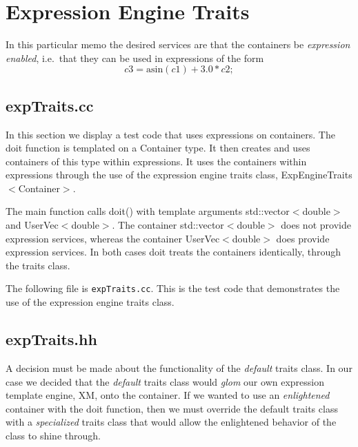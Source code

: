 \documentclass[11pt]{nmemo}
\newcommand{\cxxcode}{\color{codecolor}}
\newcommand{\code}[1]{\textcolor{codecolor}{#1}}
\newcommand{\tmpl}[1]{$<$#1$>$}
\begin{document}
\section{Expression Engine Traits}

In this particular memo the desired services are that the containers
be {\em expression enabled}, i.e.\ that they can be used in expressions of the
form
\begin{equation}
  \label{eq:expression}
  c3 = \mbox{asin}(c1) + 3.0*c2;
\end{equation}

\subsection{expTraits.cc}

In this section we display a test code that uses expressions
on containers.
The \code{doit} function is templated on a
\code{Container} type.
It then creates and uses containers of this type within expressions.
It uses the containers within expressions through the use of
the expression engine traits class, \code{ExpEngineTraits\tmpl{Container}}.

The \code{main} function calls
\code{doit()} with template arguments
\code{std::vector\tmpl{double}} and \linebreak
\code{UserVec\tmpl{double}}.
The container \code{std::vector\tmpl{double}} does not provide expression
services,
whereas the container
\code{UserVec\tmpl{double}} does provide expression
services.
In both cases \code{doit} treats the containers identically, through the traits
class.

The following file is \texttt{expTraits.cc}.
This is the test code that demonstrates the use of the expression engine traits class.

\begin{ttfamily}
\begin{small}
\cxxcode

\end{small}
\end{ttfamily}

\subsection{expTraits.hh}

A decision must be made about the functionality of the \emph{default} traits
class.
In our case we decided that the \emph{default} traits class would \emph{glom}
our own expression template engine,
\code{XM}, onto the container\cite{Furnish97}.
If we wanted to use an \emph{enlightened} container with the \code{doit}
function, then we must override the default traits class with a \emph{specialized}
traits class that would allow the enlightened behavior of the class to
shine through.
\end{document}
